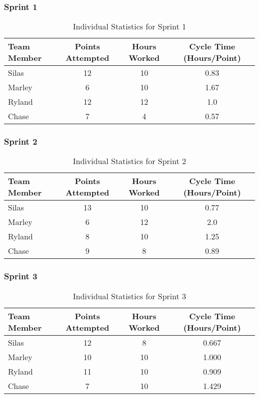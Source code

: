 \subsubsection{Sprint 1}
\begin{table}[H]
    \centering
    \begin{tabular}{|l|c|c|c|}
    \hline
    \textbf{Team Member} & \textbf{Points Attempted} & \textbf{Hours Worked} & \textbf{Cycle Time (Hours/Point)} \\ \hline
    Silas & 12 & 10 & 0.83 \\ \hline
    Marley & 6 & 10 & 1.67 \\ \hline
    Ryland & 12 & 12 & 1.0 \\ \hline
    Chase & 7 & 4 & 0.57 \\ \hline
    \end{tabular}
    \caption{Individual Statistics for Sprint 1}
    \label{tab:individual_sprint1}
\end{table}

\subsubsection{Sprint 2}
\begin{table}[H]
    \centering
    \begin{tabular}{|l|c|c|c|}
    \hline
    \textbf{Team Member} & \textbf{Points Attempted} & \textbf{Hours Worked} & \textbf{Cycle Time (Hours/Point)} \\ \hline
    Silas & 13 & 10 & 0.77 \\ \hline
    Marley & 6 & 12 & 2.0 \\ \hline
    Ryland & 8 & 10 & 1.25 \\ \hline
    Chase & 9 & 8 & 0.89 \\ \hline
    \end{tabular}
    \caption{Individual Statistics for Sprint 2}
    \label{tab:individual_sprint2}
\end{table}

\subsubsection{Sprint 3}
\begin{table}[H]
    \centering
    \begin{tabular}{|l|c|c|c|}
    \hline
    \textbf{Team Member} & \textbf{Points Attempted} & \textbf{Hours Worked} & \textbf{Cycle Time (Hours/Point)} \\ \hline
    Silas & 12 & 8 & 0.667 \\ \hline
    Marley & 10 & 10 & 1.000 \\ \hline
    Ryland & 11 & 10 & 0.909 \\ \hline
    Chase & 7 & 10 & 1.429 \\ \hline
    \end{tabular}
    \caption{Individual Statistics for Sprint 3}
    \label{tab:individual_sprint3}
\end{table}

